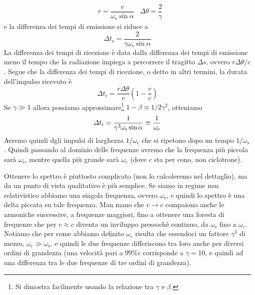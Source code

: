 \begin{align}
&r = \dfrac{v}{\omega_\mathrm{s} \sin\alpha}
&\Delta \theta = \dfrac{2}{\gamma}
\end{align}
e la differenza dei tempi di emissione si riduce a 
\begin{equation}
\Delta t_\mathrm{e} = \dfrac{2}{\gamma\omega_\mathrm{s}\sin\alpha}
\end{equation}
La differenza dei tempi di ricezione è data dalla differenza dei tempi di emissione meno il tempo che la radiazione impiega a percorrere il tragitto $\Delta s$, ovvero $r\Delta\theta /c$. Segue che la differenza dei tempi di ricezione, o detto in altri termini, la durata dell'impulso ricevuto è
\begin{equation}
\Delta t_\mathrm{r} = \dfrac{r\Delta\theta}{v}\left(1-\dfrac{v}{c}\right)
\end{equation}
Se $\gamma \gg 1$ allora possiamo approssimare\footnote{Si dimostra facilmente usando la relazione tra $\gamma$ e $\beta$.} $1-\beta \approx 1/2\gamma^2$, otteniamo
\begin{equation}
\Delta t_\mathrm{r} = \dfrac{1}{\gamma^3 \omega_\mathrm{s} \sin\alpha} \equiv \dfrac{1}{\omega_\mathrm{c}}
\end{equation}
Avremo quindi dgli impulsi di larghezza $1/\omega_\mathrm{c}$ che si ripetono dopo un tempo $1/\omega_\mathrm{s}$. Quindi passando al dominio delle frequenze avremo che la frequenza più piccola sarà $\omega_\mathrm{s}$, mentre quella più grande sarà $\omega_\mathrm{c}$ (dove $c$ sta per cono, non ciclotrone). 

Ottenere lo spettro è piuttosto complicato (non lo calcoleremo nel dettaglio), ma da un punto di vista qualitativo è più semplice. Se siamo in regime non relativistico abbiamo una singola frequenza, ovvero $\omega_\mathrm{s}$, e quindi lo spettro è una delta piccata su tale frequenza. Man mano che $v\to c$ compaiono anche le armoniche successive, a frequenze maggiori, fino a ottenere una foresta di frequenze che per $v\approx c$ diventa un inviluppo pressochè continuo, da $\omega_\mathrm{s}$ fino a $\omega_\mathrm{c}$. Notiamo che per come abbiamo definito $\omega_\mathrm{c}$ risulta che essendoci un fattore $\gamma^3$ di mezzo, $\omega_\mathrm{c}\gg\omega_\mathrm{s}$, e quindi le due frequenze differiscono tra loro anche per diversi ordini di grandezza (una velocità pari a $99\% c$ corrisponde a $\gamma=10$, e quindi ad una differenza tra le due frequenze di tre ordini di grandezza). 

